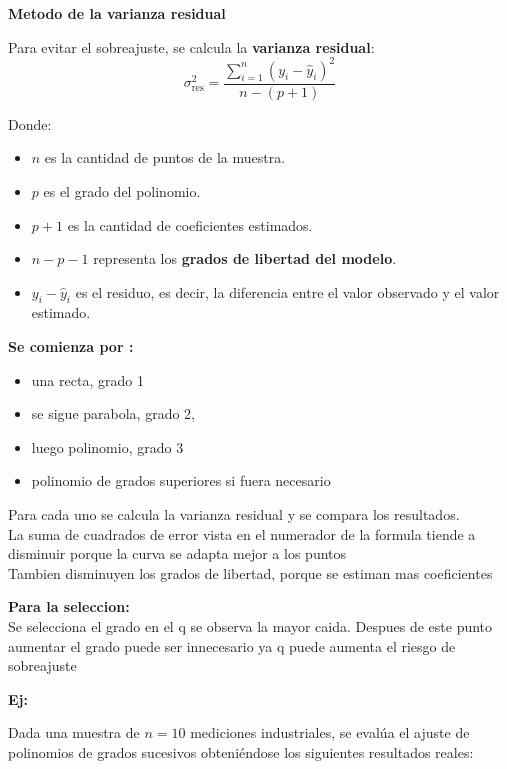 \documentclass[12pt,a4paper]{article}
\begin{document}
\begin{center}
{\fontsize{17}{21}\selectfont\bfseries Metodo de la varianza residual}
\end{center}

\hspace{14pt}\begin{minipage}{0.94\linewidth}
Para evitar el sobreajuste, se calcula la \textbf{varianza residual}:
\[
\sigma_{\text{res}}^2 = \frac{\displaystyle\sum_{i=1}^{n} (y_i-\hat{y}_i)^2}{n-(p+1)}
\]

Donde:
\begin{itemize}[leftmargin=20pt,itemsep=4pt,topsep=3pt,parsep=0pt]
  \item $n$ es la cantidad de puntos de la muestra.
  \item $p$ es el grado del polinomio.
  \item $p+1$ es la cantidad de coeficientes estimados.
  \item $n-p-1$ representa los \textbf{grados de libertad del modelo}.
  \item $y_i - \hat{y}_i$ es el residuo, es decir, la diferencia entre el valor observado y el valor estimado.
\end{itemize}

\textbf{Se comienza por :}
\begin{itemize}[leftmargin=20pt,itemsep=2pt,topsep=3pt,parsep=0pt]
  \item una recta, grado 1
  \item se sigue parabola, grado 2,
  \item luego polinomio, grado 3
  \item polinomio de grados superiores si fuera necesario
\end{itemize}
Para cada uno se calcula la varianza residual y se compara los resultados.\\
La suma de cuadrados de error vista en el numerador de la formula tiende a disminuir porque la curva se adapta mejor a los puntos\\
Tambien disminuyen los grados de libertad, porque se estiman mas coeficientes

\textbf{Para la seleccion:}\\
Se selecciona el grado en el q se observa la mayor caida. Despues de este punto aumentar el grado puede ser innecesario ya q puede aumenta el riesgo de sobreajuste

\textbf{Ej:}
\end{minipage}

Dada una muestra de $n=10$ mediciones industriales, se evalúa el ajuste de polinomios de grados sucesivos obteniéndose los siguientes resultados reales:
\end{document}
